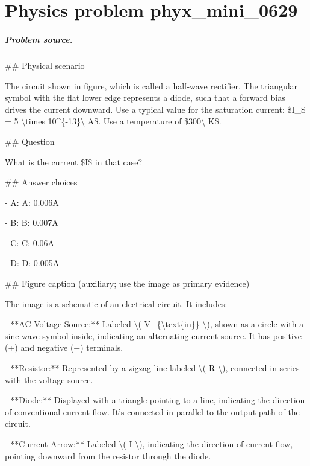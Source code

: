 
\chapter{Physics problem phyx\_mini\_0629}
\label{ch:PhyXMiniProblems_problem_phyx_mini_0629}

\paragraph{Problem source.}
\#\# Physical scenario

The circuit shown in figure, which is called a half-wave rectifier. The triangular symbol with the flat lower edge represents a diode, such that a forward bias drives the current downward. Use a typical value for the saturation current: \$I\_S = 5 \textbackslash{}times 10\textasciicircum{}\{-13\}\textbackslash{} A\$. Use a temperature of \$300\textbackslash{} K\$.

\#\# Question

What is the current \$I\$ in that case?

\#\# Answer choices

- A: A: 0.006A

- B: B: 0.007A

- C: C: 0.06A

- D: D: 0.005A

\#\# Figure caption (auxiliary; use the image as primary evidence)

The image is a schematic of an electrical circuit. It includes:

- **AC Voltage Source:** Labeled \textbackslash{}( V\_\{\textbackslash{}text\{in\}\} \textbackslash{}), shown as a circle with a sine wave symbol inside, indicating an alternating current source. It has positive (+) and negative (−) terminals.

- **Resistor:** Represented by a zigzag line labeled \textbackslash{}( R \textbackslash{}), connected in series with the voltage source.

- **Diode:** Displayed with a triangle pointing to a line, indicating the direction of conventional current flow. It's connected in parallel to the output path of the circuit.

- **Current Arrow:** Labeled \textbackslash{}( I \textbackslash{}), indicating the direction of current flow, pointing downward from the resistor through the diode.

